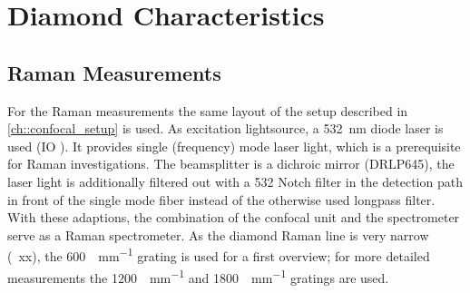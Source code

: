 
\section{Diamond Characteristics}

	\subsection{Raman Measurements} \label{subsec::raman}

	For the Raman measurements the same layout of the setup described in \autoref{ch::confocal_setup} is used.
	As excitation lightsource, a \SI{532}{nm} diode laser is used (IO ).
	It provides single (frequency) mode laser light, which is a prerequisite for Raman investigations.
	The beamsplitter is a dichroic mirror (DRLP645), the laser light is additionally filtered out with a 532 Notch filter in the detection path in front of the single mode fiber instead of the otherwise used longpass filter.
	With these adaptions, the combination of the confocal unit and the spectrometer serve as a Raman spectrometer.
	As the diamond Raman line is very narrow (~xx), the \SI[per-mode=symbol]{600}{\lines\per\mm} grating is used for a first overview; for more detailed measurements the \SI[per-mode=symbol]{1200}{\lines\per\mm} and \SI[per-mode=symbol]{1800}{\lines\per\mm} gratings are used.
